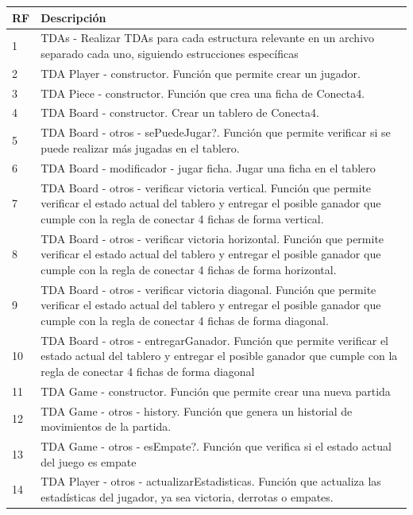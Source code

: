 \documentclass[12pt]{article}
\begin{document}
	\begin{table}[h]
		\centering
		\begin{tabular}{|l|p{10cm}|}
			\hline
			\textbf{RF} & \textbf{Descripción} \\
			\hline
			1 &  TDAs - Realizar TDAs para cada estructura relevante en un archivo separado cada uno, siguiendo estrucciones específicas \\
			\hline
			2 &  TDA Player - constructor. Función que permite crear un jugador.\\
			\hline
			3 &  TDA Piece - constructor. Función que crea una ficha de Conecta4.\\
			\hline
			4 &  TDA Board - constructor. Crear un tablero de Conecta4.\\
			\hline
			5 &  TDA Board - otros - sePuedeJugar?. Función que permite verificar si se puede realizar más jugadas en el tablero.\\
			\hline
			6 &  TDA Board - modificador - jugar ficha. Jugar una ficha en el tablero\\
			\hline
			7 &  TDA Board - otros - verificar victoria vertical. Función que permite verificar el estado actual del tablero y entregar el posible ganador que cumple con la regla de conectar 4 fichas de forma vertical.\\
			\hline
			8 &  TDA Board - otros - verificar victoria horizontal. Función que permite verificar el estado actual del tablero y entregar el posible ganador que cumple con la regla de conectar 4 fichas de forma horizontal.\\
			\hline
			9 &  TDA Board - otros - verificar victoria diagonal. Función que permite verificar el estado actual del tablero y entregar el posible ganador que cumple con la regla de conectar 4 fichas de forma diagonal.\\
			\hline
			10 &  TDA Board - otros - entregarGanador. Función que permite verificar el estado actual del tablero y entregar el posible ganador que cumple con la regla de conectar 4 fichas de forma diagonal\\
			\hline
			11 &  TDA Game - constructor. Función que permite crear una nueva partida\\
			\hline
			12 &  TDA Game - otros - history. Función que genera un historial de movimientos de la partida.\\
			\hline
			13 &  TDA Game - otros - esEmpate?. Función que verifica si el estado actual del juego es empate\\
			\hline
			14 &  TDA Player - otros - actualizarEstadisticas. Función que actualiza las estadísticas del jugador, ya sea victoria, derrotas o empates.\\

\end{tabular}
\end{table}
\end{document}
